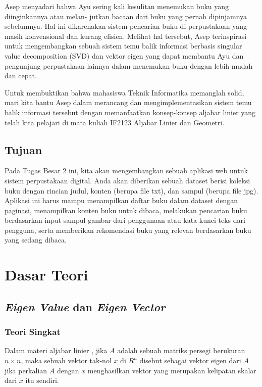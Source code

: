 \documentclass[12pt,a4paper]{article}
\begin{document}
Asep menyadari bahwa Ayu sering kali kesulitan menemukan buku yang diinginkannya atau melan-
jutkan bacaan dari buku yang pernah dipinjamnya sebelumnya. Hal ini dikarenakan sistem pencarian buku di perpustakaan yang masih konvensional dan kurang efisien. Melihat hal tersebut, Asep terinspirasi untuk mengembangkan sebuah sistem temu balik informasi berbasis singular value decomposition (SVD) dan vektor eigen yang dapat membantu Ayu dan pengunjung perpustakaan lainnya dalam menemukan buku dengan lebih mudah dan cepat. 

Untuk membuktikan bahwa mahasiswa Teknik Informatika memanglah solid, mari kita bantu Asep dalam merancang dan mengimplementasikan sistem temu balik informasi tersebut dengan memanfaatkan konsep-konsep aljabar linier yang telah kita pelajari di mata kuliah IF2123 Aljabar Linier dan Geometri.

\subsection{Tujuan}
Pada Tugas Besar 2 ini, kita akan mengembangkan sebuah aplikasi web untuk sistem perpustakaan digital. Anda akan diberikan sebuah dataset berisi koleksi buku dengan rincian judul, konten (berupa file txt), dan sampul (berupa file jpg). Aplikasi ini harus mampu menampilkan daftar buku dalam dataset dengan 
\href{https://developer.mozilla.org/en-US/docs/Web/CSS/How_to/Layout_cookbook/Pagination}{paginasi}, menampilkan konten buku untuk dibaca, melakukan pencarian buku berdasarkan input sampul gambar dari penggunaan atau kata kunci teks dari pengguna, serta memberikan rekomendasi buku yang relevan berdasarkan buku yang sedang dibaca.

\newpage
\section{Dasar Teori}

\subsection{\textit{Eigen Value} dan \textit{Eigen Vector}}
\subsubsection{Teori Singkat}

Dalam materi aljabar linier \cite{algeo2025}, jika $A$ adalah sebuah matriks persegi berukuran $n \times n$, maka sebuah vektor tak-nol $x$ di $R^n$ disebut sebagai vektor eigen dari $A$ jika perkalian $A$ dengan $x$ menghasilkan vektor yang merupakan kelipatan skalar dari $x$ itu sendiri.\\
\end{document}
